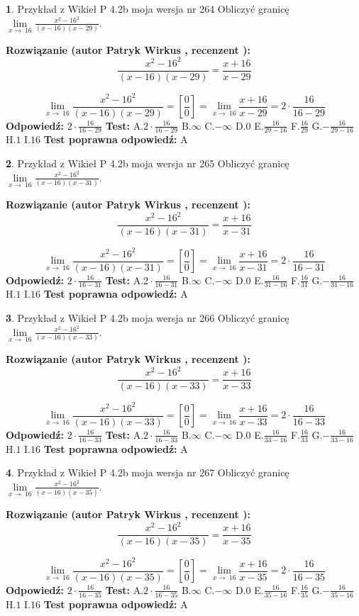 \documentclass[12pt, a4paper]{article}
\theoremstyle{definition} %
\newtheorem{zad}{}
\newcommand{\zadStart}[1]{\begin{zad}#1\newline}
\newcommand{\zadStop}{\end{zad}}
\newcommand{\rozwStart}[2]{\noindent \textbf{Rozwiązanie (autor #1 , recenzent #2): }\newline}
\newcommand{\rozwStop}{\newline}
\newcommand{\odpStart}{\noindent \textbf{Odpowiedź:}\newline}
\newcommand{\odpStop}{\newline}
\newcommand{\testStart}{\noindent \textbf{Test:}\newline}
\newcommand{\testStop}{\newline}
\newcommand{\kluczStart}{\noindent \textbf{Test poprawna odpowiedź:}\newline}
\newcommand{\kluczStop}{\newline}
\begin{document}
\zadStart{Przykład z Wikieł P 4.2b moja wersja nr 264}
Obliczyć granicę $\lim\limits_{x\to\ 16}\frac{x^{2}-16^{2}}{(x-16)(x-29)}$.
\zadStop
\rozwStart{Patryk Wirkus}{}
$$\frac{x^{2}-16^{2}}{(x-16)(x-29)}=\frac{x+16}{x-29}$$

$$\lim\limits_{x\to\ 16}\frac{x^{2}-16^{2}}{(x-16)(x-29)}=[\frac{0}{0}]=\lim\limits_{x\to\ 16}\frac{x+16}{x-29}=2 \cdot \frac{16}{16-29}$$
\rozwStop
\odpStart
$2 \cdot \frac{16}{16-29}$
\odpStop
\testStart
A.$2 \cdot \frac{16}{16-29}$
B.$\infty$
C.$-\infty$
D.$0$
E.$\frac{16}{29-16}$
F.$\frac{16}{29}$
G.$-\frac{16}{29-16}$
H.$1$
I.$16$
\testStop
\kluczStart
A
\kluczStop



\zadStart{Przykład z Wikieł P 4.2b moja wersja nr 265}
Obliczyć granicę $\lim\limits_{x\to\ 16}\frac{x^{2}-16^{2}}{(x-16)(x-31)}$.
\zadStop
\rozwStart{Patryk Wirkus}{}
$$\frac{x^{2}-16^{2}}{(x-16)(x-31)}=\frac{x+16}{x-31}$$

$$\lim\limits_{x\to\ 16}\frac{x^{2}-16^{2}}{(x-16)(x-31)}=[\frac{0}{0}]=\lim\limits_{x\to\ 16}\frac{x+16}{x-31}=2 \cdot \frac{16}{16-31}$$
\rozwStop
\odpStart
$2 \cdot \frac{16}{16-31}$
\odpStop
\testStart
A.$2 \cdot \frac{16}{16-31}$
B.$\infty$
C.$-\infty$
D.$0$
E.$\frac{16}{31-16}$
F.$\frac{16}{31}$
G.$-\frac{16}{31-16}$
H.$1$
I.$16$
\testStop
\kluczStart
A
\kluczStop



\zadStart{Przykład z Wikieł P 4.2b moja wersja nr 266}
Obliczyć granicę $\lim\limits_{x\to\ 16}\frac{x^{2}-16^{2}}{(x-16)(x-33)}$.
\zadStop
\rozwStart{Patryk Wirkus}{}
$$\frac{x^{2}-16^{2}}{(x-16)(x-33)}=\frac{x+16}{x-33}$$

$$\lim\limits_{x\to\ 16}\frac{x^{2}-16^{2}}{(x-16)(x-33)}=[\frac{0}{0}]=\lim\limits_{x\to\ 16}\frac{x+16}{x-33}=2 \cdot \frac{16}{16-33}$$
\rozwStop
\odpStart
$2 \cdot \frac{16}{16-33}$
\odpStop
\testStart
A.$2 \cdot \frac{16}{16-33}$
B.$\infty$
C.$-\infty$
D.$0$
E.$\frac{16}{33-16}$
F.$\frac{16}{33}$
G.$-\frac{16}{33-16}$
H.$1$
I.$16$
\testStop
\kluczStart
A
\kluczStop



\zadStart{Przykład z Wikieł P 4.2b moja wersja nr 267}
Obliczyć granicę $\lim\limits_{x\to\ 16}\frac{x^{2}-16^{2}}{(x-16)(x-35)}$.
\zadStop
\rozwStart{Patryk Wirkus}{}
$$\frac{x^{2}-16^{2}}{(x-16)(x-35)}=\frac{x+16}{x-35}$$

$$\lim\limits_{x\to\ 16}\frac{x^{2}-16^{2}}{(x-16)(x-35)}=[\frac{0}{0}]=\lim\limits_{x\to\ 16}\frac{x+16}{x-35}=2 \cdot \frac{16}{16-35}$$
\rozwStop
\odpStart
$2 \cdot \frac{16}{16-35}$
\odpStop
\testStart
A.$2 \cdot \frac{16}{16-35}$
B.$\infty$
C.$-\infty$
D.$0$
E.$\frac{16}{35-16}$
F.$\frac{16}{35}$
G.$-\frac{16}{35-16}$
H.$1$
I.$16$
\testStop
\kluczStart
A
\kluczStop
\end{document}
